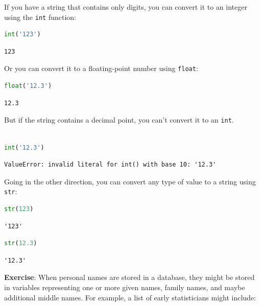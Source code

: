If you have a string that contains only digits, you can convert it to an
integer using the \passthrough{\lstinline!int!} function:

\begin{lstlisting}[language=Python,style=source]
int('123')
\end{lstlisting}

\begin{lstlisting}[style=output]
123
\end{lstlisting}

Or you can convert it to a floating-point number using
\passthrough{\lstinline!float!}:

\begin{lstlisting}[language=Python,style=source]
float('12.3')
\end{lstlisting}

\begin{lstlisting}[style=output]
12.3
\end{lstlisting}

But if the string contains a decimal point, you can't convert it to an
\passthrough{\lstinline!int!}.

\begin{lstlisting}[language=Python,style=source]
%%expect ValueError

int('12.3')
\end{lstlisting}

\begin{lstlisting}[style=output]
ValueError: invalid literal for int() with base 10: '12.3'
\end{lstlisting}

Going in the other direction, you can convert any type of value to a
string using \passthrough{\lstinline!str!}:

\begin{lstlisting}[language=Python,style=source]
str(123)
\end{lstlisting}

\begin{lstlisting}[style=output]
'123'
\end{lstlisting}

\begin{lstlisting}[language=Python,style=source]
str(12.3)
\end{lstlisting}

\begin{lstlisting}[style=output]
'12.3'
\end{lstlisting}

\textbf{Exercise}: When personal names are stored in a database, they
might be stored in variables representing one or more given names,
family names, and maybe additional middle names. For example, a list of
early statisticians might include:

